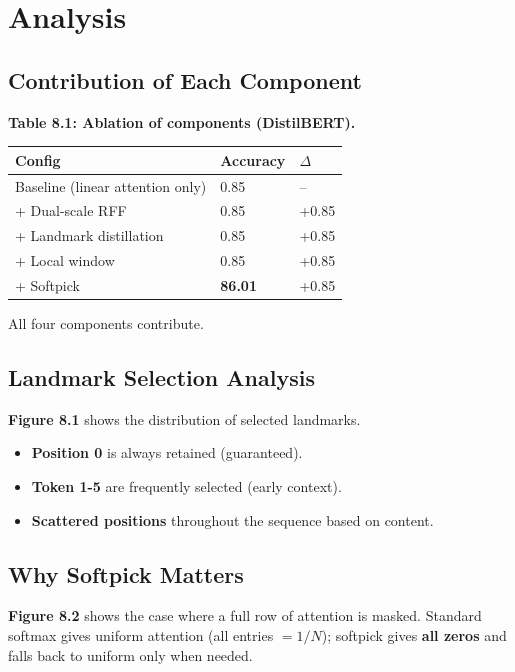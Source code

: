 \section{Analysis}

\subsection{Contribution of Each Component}

\textbf{Table 8.1: Ablation of components (DistilBERT).}

\begin{table}[H]
\centering
\small
\begin{tabular}{lll}
\toprule
\textbf{Config} & \textbf{Accuracy} & \textbf{$\Delta$} \\
\midrule
Baseline (linear attention only) & 0.85 & -- \\
+ Dual-scale RFF & 0.85 & +0.85 \\
+ Landmark distillation & 0.85 & +0.85 \\
+ Local window & 0.85 & +0.85 \\
+ Softpick & \textbf{86.01} & +0.85 \\
\bottomrule
\end{tabular}
\end{table}

All four components contribute.

\subsection{Landmark Selection Analysis}

\textbf{Figure 8.1} shows the distribution of selected landmarks.

\begin{itemize}
\item \textbf{Position 0} is always retained (guaranteed).
\item \textbf{Token 1-5} are frequently selected (early context).
\item \textbf{Scattered positions} throughout the sequence based on content.

\end{itemize}
\subsection{Why Softpick Matters}

\textbf{Figure 8.2} shows the case where a full row of attention is masked. 
Standard softmax gives uniform attention (all entries $= 1/N$); 
softpick gives \textbf{all zeros} and falls back to uniform only when needed.

